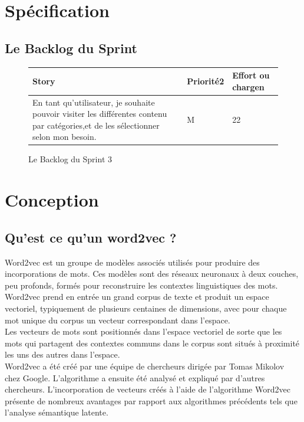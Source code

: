 \section{Spécification}
\subsection{Le Backlog du Sprint}
\begin{figure}[H]
\begin{tabular}{|p{7cm}|p{4cm}|p{4cm}|}
\hline
\textbf{Story} & \textbf{Priorité2 } & \textbf{Effort ou chargen} \\
\hline
En tant qu'utilisateur, je souhaite pouvoir visiter les différentes contenu par catégories,et de les sélectionner selon mon besoin. & \begin{center}M\end{center} & \begin{center}22\end{center}\\
\hline
\end{tabular}
  \caption{Le Backlog du Sprint 3}
  \label{fig:Backlog3}
\end{figure}
\section{Conception}
\subsection{Qu'est ce qu'un word2vec ?}
Word2vec est un groupe de modèles associés utilisés pour produire des incorporations de mots. Ces modèles sont des réseaux neuronaux à deux couches, peu profonds, formés pour reconstruire les contextes linguistiques des mots. Word2vec prend en entrée un grand corpus de texte et produit un espace vectoriel, typiquement de plusieurs centaines de dimensions, avec pour chaque mot unique du corpus un vecteur correspondant dans l'espace.\\[0.5cm]
 Les vecteurs de mots sont positionnés dans l'espace vectoriel de sorte que les mots qui partagent des contextes communs dans le corpus sont situés à proximité les uns des autres dans l'espace.\\[0.2cm]
Word2vec a été créé par une équipe de chercheurs dirigée par Tomas Mikolov chez Google. L'algorithme a ensuite été analysé et expliqué par d'autres chercheurs.  L'incorporation de vecteurs créés à l'aide de l'algorithme Word2vec présente de nombreux avantages par rapport aux algorithmes précédents tels que l'analyse sémantique latente.
